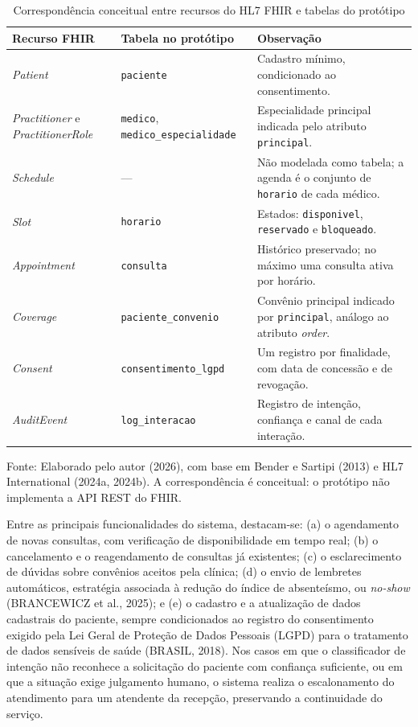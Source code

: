 \documentclass[12pt,a4paper]{extarticle}
\begin{document}
\begin{table}[H]
\centering
\caption{Correspondência conceitual entre recursos do HL7 FHIR e tabelas do protótipo}
\label{tab:fhir-correspondencia}
\small
\begin{tabularx}{\textwidth}{p{3.4cm}p{4.4cm}Y}
\hline
\textbf{Recurso FHIR} & \textbf{Tabela no protótipo} & \textbf{Observação} \\
\hline
\textit{Patient} & \texttt{paciente} & Cadastro mínimo, condicionado ao consentimento. \\
\textit{Practitioner} e \textit{PractitionerRole} & \texttt{medico}, \texttt{medico\_\allowbreak{}especialidade} & Especialidade principal indicada pelo atributo \texttt{principal}. \\
\textit{Schedule} & --- & Não modelada como tabela; a agenda é o conjunto de \texttt{horario} de cada médico. \\
\textit{Slot} & \texttt{horario} & Estados: \texttt{disponivel}, \texttt{reservado} e \texttt{bloqueado}. \\
\textit{Appointment} & \texttt{consulta} & Histórico preservado; no máximo uma consulta ativa por horário. \\
\textit{Coverage} & \texttt{paciente\_\allowbreak{}convenio} & Convênio principal indicado por \texttt{principal}, análogo ao atributo \textit{order}. \\
\textit{Consent} & \texttt{consentimento\_\allowbreak{}lgpd} & Um registro por finalidade, com data de concessão e de revogação. \\
\textit{AuditEvent} & \texttt{log\_\allowbreak{}interacao} & Registro de intenção, confiança e canal de cada interação. \\
\hline
\end{tabularx}
\vspace{0.3cm}

\footnotesize{Fonte: Elaborado pelo autor (2026), com base em Bender e Sartipi (2013) e HL7 International (2024a, 2024b). A correspondência é conceitual: o protótipo não implementa a API REST do FHIR.}
\end{table}


Entre as principais funcionalidades do sistema, destacam-se: (a) o agendamento de novas consultas, com verificação de disponibilidade em tempo real; (b) o cancelamento e o reagendamento de consultas já existentes; (c) o esclarecimento de dúvidas sobre convênios aceitos pela clínica; (d) o envio de lembretes automáticos, estratégia associada à redução do índice de absenteísmo, ou \textit{no-show} (BRANCEWICZ et al., 2025); e (e) o cadastro e a atualização de dados cadastrais do paciente, sempre condicionados ao registro do consentimento exigido pela Lei Geral de Proteção de Dados Pessoais (LGPD) para o tratamento de dados sensíveis de saúde (BRASIL, 2018). Nos casos em que o classificador de intenção não reconhece a solicitação do paciente com confiança suficiente, ou em que a situação exige julgamento humano, o sistema realiza o escalonamento do atendimento para um atendente da recepção, preservando a continuidade do serviço.
\end{document}

